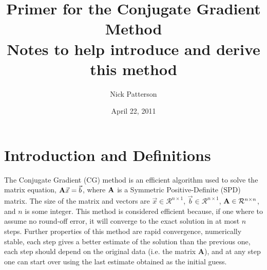 \documentclass[11pt,letterpaper,oneside,notitlepage]{article}	%
\newcommand{\bfa}{{\bf A}}						%
\newcommand{\pindent}[1]{\hspace{6mm}}  		%
\numberwithin{equation}{section}				%
\begin{document}

\title{Primer for the Conjugate Gradient Method\\ {\small Notes to help introduce and derive this method}}
\author{Nick Patterson}
\date{April 22, 2011}								%
\maketitle									%

\tableofcontents
\newpage

\section{Introduction and Definitions}%
\pindent{}The Conjugate Gradient (CG) method is an efficient algorithm used to solve the matrix equation, $\bfa \vec x = \vec b$, where $\bfa$ is a Symmetric Positive-Definite (SPD) matrix. The size of the matrix and vectors are $\vec x \in \mathcal{R}^{n\times 1}$, $\vec b \in \mathcal{R}^{n\times 1}$, $\bfa \in \mathcal{R}^{n\times n}$, and $n$ is some integer. This method is considered efficient because, if one where to assume no round-off error, it will converge to the exact solution in at most $n$ steps\cite{CG1952}. Further properties of this method are rapid convergence, numerically stable, each step gives a better estimate of the solution than the previous one, each step should depend on the original data (i.e. the matrix \bfa), and at any step one can start over using the last estimate obtained as the initial guess\cite{CG1952}.
\end{document}

